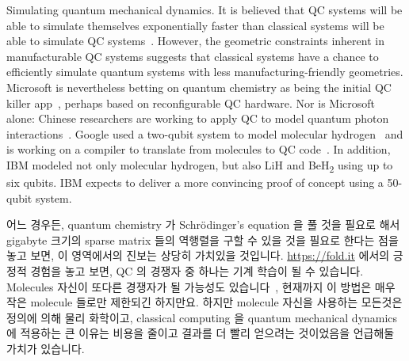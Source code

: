 Simulating quantum mechanical dynamics.
It is believed that QC systems will be able to simulate themselves
exponentially faster than classical systems will be able to
simulate QC systems~\cite{Feynman1982}.
However, the geometric constraints inherent in manufacturable
QC systems suggests that classical systems have a chance
to efficiently simulate quantum systems with less
manufacturing-friendly geometries.
Microsoft is nevertheless betting on quantum chemistry as being
the initial QC killer app~\cite{TomSimonite2017QC-MS-Chemistry},
perhaps based on reconfigurable QC hardware.
Nor is Microsoft alone: Chinese researchers are working to apply
QC to model quantum photon interactions~\cite{StephenChen2017ChinaQC}.
Google used a two-qubit system to model molecular
hydrogen~\cite{RichardChirgwin2016GoogleQC} and is working on a
compiler to translate from molecules to QC
code~\cite{RichardChirgwin2017GoogleQC}.
In addition, IBM modeled not only molecular hydrogen, but also
LiH and BeH\textsubscript{2} using up to six qubits.
IBM expects to deliver a more convincing proof of concept using a
50-qubit system.
\fi

어느 경우든, quantum chemistry 가 Schr\"{o}dinger's equation 을 풀 것을 필요로
해서 gigabyte 크기의 sparse matrix 들의 역행렬을 구할 수 있을 것을 필요로
한다는 점을 놓고 보면, 이 영역에서의 진보는 상당히 가치있을 것입니다.
\url{https://fold.it} 에서의 긍정적 경험을 놓고 보면, QC 의 경쟁자 중 하나는
기계 학습이 될 수 있습니다.
Molecules 자신이 또다른 경쟁자가 될 가능성도
있습니다~\cite{Chin-wenChou2017ManipulateMolecule}, 현재까지 이 방법은 매우
작은 molecule 들로만 제한되긴 하지만요.
하지만 molecule 자신을 사용하는 모든것은 정의에 의해 물리 화학이고, classical
computing 을 quantum mechanical dynamics 에 적용하는 큰 이유는 비용을 줄이고
결과를 더 빨리 얻으려는 것이었음을 언급해둘 가치가 있습니다.

